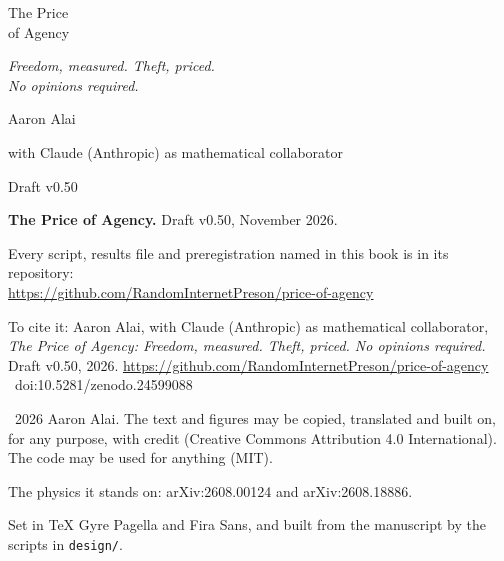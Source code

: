 \def\PrintEdition{1}

\begin{titlepage}\thispagestyle{empty}\vspace*{1.7in}
\noindent\hspace*{-\ledgertotal}\parbox[t]{\dimexpr\textwidth+\ledgertotal}{\raggedright
{\fontsize{44}{48}\selectfont The Price\\[4pt] of Agency}\par\vspace{0.42in}
{\fontsize{14}{20}\selectfont\itshape Freedom, measured. Theft, priced.\\No opinions required.}\par\vspace{2.6in}
{\sffamily\fontsize{11}{15}\selectfont Aaron Alai}\par\vspace{3pt}
{\sffamily\fontsize{9}{13}\selectfont\color{muted}with Claude (Anthropic) as mathematical collaborator}\par\vspace{0.5in}
{\sffamily\fontsize{8}{11}\selectfont\color{muted}Draft v0.50}}
\clearpage\thispagestyle{empty}\vspace*{\fill}
\noindent\parbox[b]{\textwidth}{\raggedright\sffamily\fontsize{7.8}{11.4}\selectfont\color{ink}
\textbf{The Price of Agency.} Draft v0.50, November 2026.\par\vspace{7pt}
Every script, results file and preregistration named in this book is in its repository:\\ \url{https://github.com/RandomInternetPreson/price-of-agency}\par\vspace{7pt}
To cite it: Aaron Alai, with Claude (Anthropic) as mathematical collaborator, \textit{The Price of Agency: Freedom, measured. Theft, priced. No opinions required.} Draft v0.50, 2026. \url{https://github.com/RandomInternetPreson/price-of-agency} \ doi:10.5281/zenodo.24599088\par\vspace{7pt}
\textcopyright\ 2026 Aaron Alai. The text and figures may be copied, translated and built on, for any purpose, with credit (Creative Commons Attribution 4.0 International). The code may be used for anything (MIT).\par\vspace{7pt}
The physics it stands on: arXiv:2608.00124 and arXiv:2608.18886.\par\vspace{7pt}
Set in TeX Gyre Pagella and Fira Sans, and built from the manuscript by the scripts in \texttt{design/}.}
\end{titlepage}

